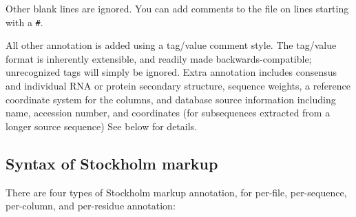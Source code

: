 Other blank lines are ignored. You can add comments to the file on
lines starting with a \verb+#+.

All other annotation is added using a tag/value comment style. The
tag/value format is inherently extensible, and readily made
backwards-compatible; unrecognized tags will simply be ignored. Extra
annotation includes consensus and individual RNA or protein secondary
structure, sequence weights, a reference coordinate system for the
columns, and database source information including name, accession
number, and coordinates (for subsequences extracted from a longer
source sequence) See below for details.

\subsection{Syntax of Stockholm markup}

There are four types of Stockholm markup annotation, for per-file,
per-sequence, per-column, and per-residue annotation:

